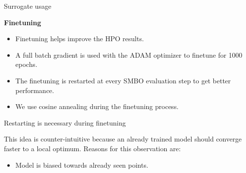 \documentclass{beamer}
\begin{document}
\begin{frame}[t]{Surrogate usage}

\textbf{Finetuning}
\begin{itemize}
\item Finetuning helps improve the HPO results.
\item A full batch gradient is used with the ADAM optimizer to finetune for 1000 epochs.
\item The finetuning is restarted at every SMBO evaluation step to get better performance.
\item We use cosine annealing during the finetuning process.
\end{itemize}

\end{frame}

\begin{frame}[t]{Restarting is necessary during finetuning}

This idea is counter-intuitive because an already trained model should converge faster to a local optimum. Reasons for this observation are:
\begin{itemize}
\item Model is biased towards already seen points.
\end{itemize}


\end{frame}
\end{document}
